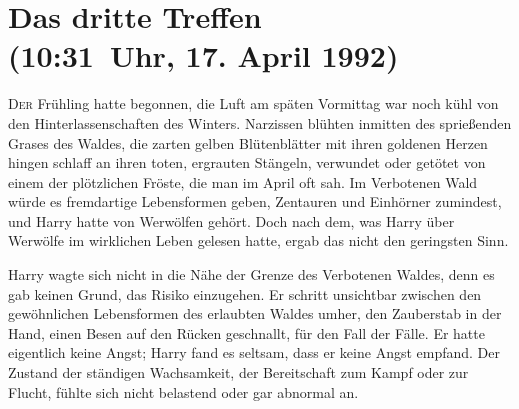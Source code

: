 
\section{Das dritte Treffen\\
(10:31~Uhr, 17. April 1992)}

\lettrine{D}{er} Frühling hatte begonnen, die Luft am späten Vormittag war noch kühl von den Hinterlassenschaften des Winters. Narzissen blühten inmitten des sprießenden Grases des Waldes, die zarten gelben Blütenblätter mit ihren goldenen Herzen hingen schlaff an ihren toten, ergrauten Stängeln, verwundet oder getötet von einem der plötzlichen Fröste, die man im April oft sah. Im Verbotenen Wald würde es fremdartige Lebensformen geben, Zentauren und Einhörner zumindest, und Harry hatte von Werwölfen gehört. Doch nach dem, was Harry über Werwölfe im wirklichen Leben gelesen hatte, ergab das nicht den geringsten Sinn.

Harry wagte sich nicht in die Nähe der Grenze des Verbotenen Waldes, denn es gab keinen Grund, das Risiko einzugehen. Er schritt unsichtbar zwischen den gewöhnlichen Lebensformen des erlaubten Waldes umher, den Zauberstab in der Hand, einen Besen auf den Rücken geschnallt, für den Fall der Fälle. Er hatte eigentlich keine Angst; Harry fand es seltsam, dass er keine Angst empfand.
Der Zustand der ständigen Wachsamkeit, der Bereitschaft zum Kampf oder zur Flucht, fühlte sich nicht belastend oder gar abnormal an.

